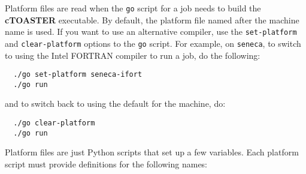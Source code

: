 \documentclass[a4paper,10pt,article]{memoir}
\begin{document}
Platform files are read when the \texttt{go} script for a job needs to
build the \textbf{cTOASTER} executable.  By default, the platform file named after
the machine name is used.  If you want to use an alternative compiler,
use the \texttt{set-platform} and \texttt{clear-platform} options to
the \texttt{go} script.  For example, on \texttt{seneca}, to switch to
using the Intel FORTRAN compiler to run a job, do the following:
\begin{verbatim}
  ./go set-platform seneca-ifort
  ./go run
\end{verbatim}
and to switch back to using the default for the machine, do:
\begin{verbatim}
  ./go clear-platform
  ./go run
\end{verbatim}
Platform files are just Python scripts that set up a few variables.
Each platform script must provide definitions for the following names:
\end{document}
